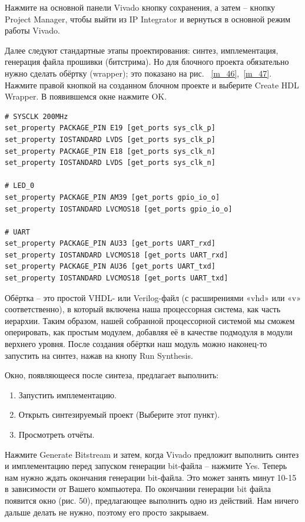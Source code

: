 \documentclass[a4paper,oneside ,14pt]{extreport}
\begin{document}
Нажмите на основной панели Vivado кнопку сохранения, а затем – кнопку 
Project Manager, чтобы выйти из IP Integrator и вернуться в основной режим работы 
Vivado.

Далее следуют стандартные этапы проектирования: синтез, имплементация, 
генерация файла прошивки (битстрима). Но для блочного проекта обязательно 
нужно сделать обёртку (wrapper); это показано на рис. ~\ref{m_46},~\ref{m_47}. Нажмите правой кнопкой на созданном блочном проекте и выберите Create HDL Wrapper. В появившемся 
окне нажмите OK.

\begin{Verbatim}[tabsize=4]
# SYSCLK 200MHz
set_property PACKAGE_PIN E19 [get_ports sys_clk_p]
set_property IOSTANDARD LVDS [get_ports sys_clk_p]
set_property PACKAGE_PIN E18 [get_ports sys_clk_n]
set_property IOSTANDARD LVDS [get_ports sys_clk_n]

# LED_0
set_property PACKAGE_PIN AM39 [get_ports gpio_io_o]
set_property IOSTANDARD LVCMOS18 [get_ports gpio_io_o]

# UART
set_property PACKAGE_PIN AU33 [get_ports UART_rxd]
set_property IOSTANDARD LVCMOS18 [get_ports UART_rxd]
set_property PACKAGE_PIN AU36 [get_ports UART_txd]
set_property IOSTANDARD LVCMOS18 [get_ports UART_txd]

\end{Verbatim}

Обёртка – это простой VHDL- или Verilog-файл (с расширениями «vhd» или 
«v» соответственно), в который включена наша процессорная система, как часть 
иерархии. Таким образом, нашей собранной процессорной системой мы сможем 
оперировать, как простым модулем, добавляя её в качестве подмодуля в модули 
верхнего уровня. После создания обёртки наш модуль можно наконец-то запустить 
на синтез, нажав на кнопу Run Synthesis.

Окно, появляющееся после синтеза, предлагает выполнить:
\begin{enumerate}
	\item Запустить имплементацию.
	\item Открыть синтезируемый проект (Выберите этот пункт).
	\item Просмотреть отчёты.
\end{enumerate}
Нажмите Generate Bitstream и затем, когда Vivado предложит выполнить 
синтез и имплементацию перед запуском генерации bit-файла – нажмите Yes.
Теперь нам нужно ждать окончания генерации bit-файла. Это может занять 
минут 10-15 в зависимости от Вашего компьютера. 
По окончании генерации bit файла появится окно (рис. 50), предлагающее выполнить одно из действий. Нам 
ничего дальше делать не нужно, поэтому его просто закрываем.
\end{document}
